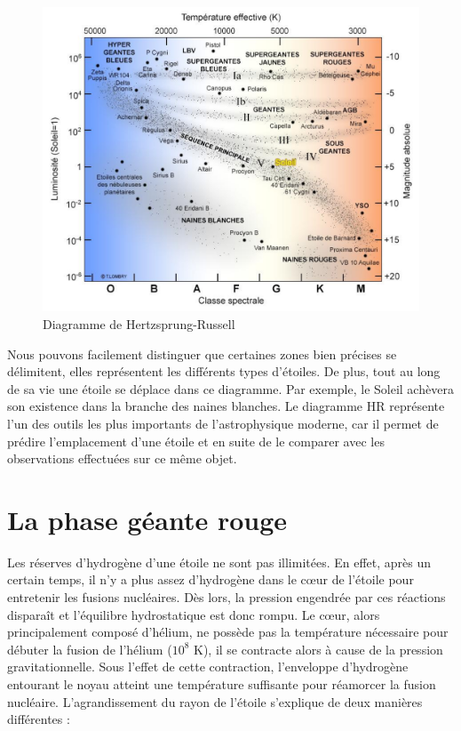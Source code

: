 \begin{figure}[H]\vspace{1cm}
	\centering
	\includegraphics[scale=0.4]{images/hr-diagram}
	\caption[Diagramme de Hertzsprung-Russell]{Diagramme de Hertzsprung-Russell}
	\label{Fig. 2.2}
\end{figure}\bigskip

Nous pouvons facilement distinguer que certaines zones bien précises se délimitent, elles représentent les différents types d’étoiles. De plus, tout au long de sa vie une étoile se déplace dans ce diagramme. Par exemple, le Soleil achèvera son existence dans la branche des naines blanches. Le diagramme HR représente l’un des outils les plus importants de l’astrophysique moderne, car il permet de prédire l’emplacement d’une étoile et en suite de le comparer avec les observations effectuées sur ce même objet.\bigskip

\section{La phase géante rouge}\label{2.2}

Les réserves d’hydrogène d’une étoile ne sont pas illimitées. En effet, après un certain temps, il n’y a plus assez d’hydrogène dans le cœur de l’étoile pour entretenir les fusions nucléaires. Dès lors, la pression engendrée par ces réactions disparaît et l’équilibre hydrostatique est donc rompu. Le cœur, alors principalement composé d’hélium, ne possède pas la température nécessaire pour débuter la fusion de l’hélium ($10^{8}$ K), il se contracte alors à cause de la pression gravitationnelle. Sous l’effet de cette contraction, l’enveloppe d’hydrogène entourant le noyau atteint une température suffisante pour réamorcer la fusion nucléaire. L’agrandissement du rayon de l’étoile s’explique de deux manières différentes :

